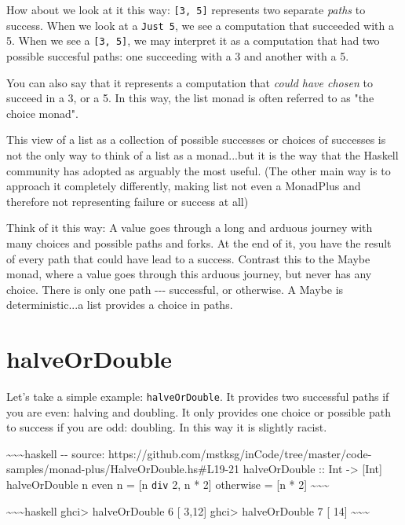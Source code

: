 \documentclass[]{article}
\begin{document}
How about we look at it this way: \texttt{{[}3,\ 5{]}} represents two separate
\emph{paths} to success. When we look at a \texttt{Just\ 5}, we see a
computation that succeeded with a 5. When we see a \texttt{{[}3,\ 5{]}}, we may
interpret it as a computation that had two possible succesful paths: one
succeeding with a 3 and another with a 5.

You can also say that it represents a computation that \emph{could have chosen}
to succeed in a 3, or a 5. In this way, the list monad is often referred to as
"the choice monad".

This view of a list as a collection of possible successes or choices of
successes is not the only way to think of a list as a monad...but it is the way
that the Haskell community has adopted as arguably the most useful. (The other
main way is to approach it completely differently, making list not even a
MonadPlus and therefore not representing failure or success at all)

Think of it this way: A value goes through a long and arduous journey with many
choices and possible paths and forks. At the end of it, you have the result of
every path that could have lead to a success. Contrast this to the Maybe monad,
where a value goes through this arduous journey, but never has any choice. There
is only one path -\/-\/- successful, or otherwise. A Maybe is deterministic...a
list provides a choice in paths.

\section{halveOrDouble}

Let's take a simple example: \texttt{halveOrDouble}. It provides two successful
paths if you are even: halving and doubling. It only provides one choice or
possible path to success if you are odd: doubling. In this way it is slightly
racist.

\textasciitilde{}\textasciitilde{}\textasciitilde{}haskell -\/- source:
https://github.com/mstksg/inCode/tree/master/code-samples/monad-plus/HalveOrDouble.hs\#L19-21
halveOrDouble :: Int -\textgreater{} {[}Int{]} halveOrDouble n \textbar{} even n
= {[}n \texttt{div} 2, n * 2{]} \textbar{} otherwise = {[}n * 2{]}
\textasciitilde{}\textasciitilde{}\textasciitilde{}

\textasciitilde{}\textasciitilde{}\textasciitilde{}haskell ghci\textgreater{}
halveOrDouble 6 {[} 3,12{]} ghci\textgreater{} halveOrDouble 7 {[} 14{]}
\textasciitilde{}\textasciitilde{}\textasciitilde{}
\end{document}
